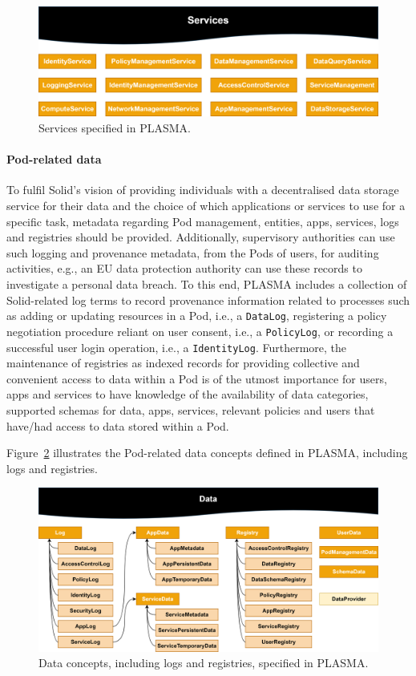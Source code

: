 \begin{figure}[htb]
    \centering
    \includegraphics[width=\linewidth]{figures/chapter-4/services.png}
    \caption{Services specified in PLASMA.}
    \label{fig:plasma_services}
\end{figure}

\paragraph{Pod-related data}
To fulfil Solid's vision of providing individuals with a decentralised data storage service for their data and the choice of which applications or services to use for a specific task, metadata regarding Pod management, entities, apps, services, logs and registries should be provided.
Additionally, supervisory authorities can use such logging and provenance metadata, from the Pods of users, for auditing activities, e.g., an EU data protection authority can use these records to investigate a personal data breach.
To this end, PLASMA includes a collection of Solid-related log terms to record provenance information related to processes such as adding or updating resources in a Pod, i.e., a \texttt{DataLog}, registering a policy negotiation procedure reliant on user consent, i.e., a \texttt{PolicyLog}, or recording a successful user login operation, i.e., a \texttt{IdentityLog}.
Furthermore, the maintenance of registries as indexed records for providing collective and convenient access to data within a Pod is of the utmost importance for users, apps and services to have knowledge of the availability of data categories, supported schemas for data, apps, services, relevant policies and users that have/had access to data stored within a Pod.

Figure~\ref{fig:plasma_data} illustrates the Pod-related data concepts defined in PLASMA, including logs and registries.

\begin{figure}[htbp]
    \centering
    \includegraphics[width=\linewidth]{figures/chapter-4/data.png}
    \caption{Data concepts, including logs and registries, specified in PLASMA.}
    \label{fig:plasma_data}
\end{figure}

